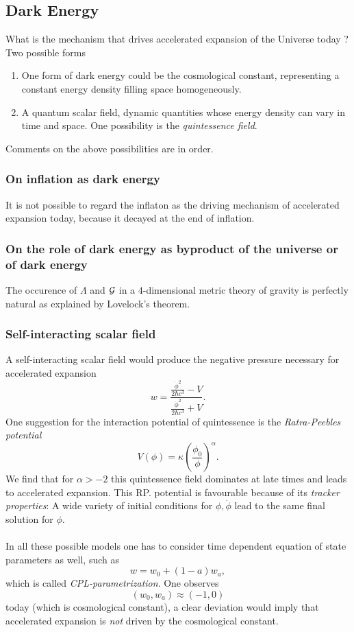 \subsection{Dark Energy}
What is the mechanism that drives accelerated expansion of the Universe today ?\\
Two possible forms
\begin{enumerate}
	\item One form of dark energy could be the cosmological constant, representing a constant energy density filling space homogeneously.
	\item A quantum scalar field, dynamic quantities whose energy density can vary in time and space. One possibility is the \emph{quintessence field}.
\end{enumerate}
Comments on the above possibilities are in order.
\subsubsection{On inflation as dark energy}
It is not possible to regard the inflaton as the driving mechanism of accelerated expansion today, because it decayed at the end of inflation.
\subsubsection{On the role of dark energy as byproduct of the universe or of dark energy}
The occurence of $\Lambda$ and $\mathcal{G}$ in a $4$-dimensional metric theory of gravity is perfectly natural as explained by Lovelock's theorem.
\subsubsection{Self-interacting scalar field}
A self-interacting scalar field would produce the negative pressure necessary for accelerated expansion
\begin{equation}
w= \frac{\frac{\dot{\phi}^2}{2 \hbar c^3} -  V}{\frac{\dot{\phi}^2}{2 \hbar c^3} + V}.
\end{equation}
One suggestion for the interaction potential of quintessence is the \emph{Ratra-Peebles potential}
\begin{equation}
	V(\phi) = \kappa \left(\frac{\phi_0}{\phi}\right)^\alpha.
\end{equation}
We find that for $\alpha > -2$ this quintessence field dominates at late times and leads to accelerated expansion. This RP. potential is favourable because of its \emph{tracker properties}: A wide variety of initial conditions for $\phi,\dot{\phi}$ lead to the same final solution for $\phi$.\\
\\
In all these possible models one has to consider time dependent equation of state parameters as well, such as
\begin{equation}
	w=w_0 +(1-a) w_a,
\end{equation}
which is called \emph{CPL-parametrization}. One observes \begin{equation}
	(w_0,w_a) \approx (-1,0)
\end{equation}
today (which is cosmological constant), a clear deviation would imply that accelerated expansion is \emph{not} driven by the cosmological constant.


